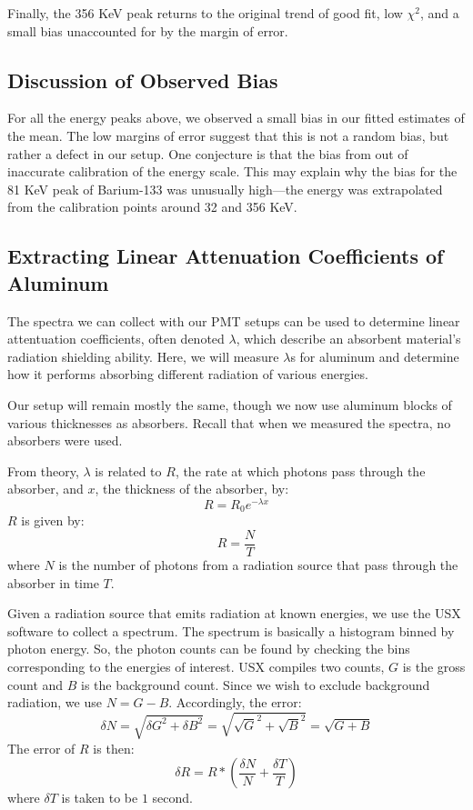 \documentclass[12pt, letterpaper]{article}
\begin{document}
Finally, the 356 KeV peak returns to the original trend of good fit, low $\chi^2$, and a small bias unaccounted for by the margin of error. 

\subsection{Discussion of Observed Bias}

For all the energy peaks above, we observed a small bias in our fitted estimates of the mean. The low margins of error suggest that this is not a random bias, but rather a defect in our setup. One conjecture is that the bias from out of inaccurate calibration of the energy scale. This may explain why the bias for the 81 KeV peak of Barium-133 was unusually high—the energy was extrapolated from the calibration points around 32 and 356 KeV. 

\subsection{Extracting Linear Attenuation Coefficients of Aluminum}

The spectra we can collect with our PMT setups can be used to determine linear attentuation coefficients, often denoted $\lambda$, which describe an absorbent material's radiation shielding ability. Here, we will measure $\lambda$s for aluminum and determine how it performs absorbing different radiation of various energies. 

Our setup will remain mostly the same, though we now use aluminum blocks of various thicknesses as absorbers. Recall that when we measured the spectra, no absorbers were used. 

From theory, $\lambda$ is related to $R$, the rate at which photons pass through the absorber, and $x$, the thickness of the absorber, by: 
\[R = R_0 e^{-\lambda x}\]
$R$ is given by:
\[R = \frac{N}{T}\]
where $N$ is the number of photons from a radiation source that pass through the absorber in time $T$. 

Given a radiation source that emits radiation at known energies, we use the USX software to collect a spectrum. The spectrum is basically a histogram binned by photon energy. So, the photon counts can be found by checking the bins corresponding to the energies of interest. USX compiles two counts, $G$ is the gross count and $B$ is the background count. Since we wish to exclude background radiation, we use $N = G - B$. Accordingly, the error:
\[\delta N = \sqrt{\delta G^2 + \delta B^2} = \sqrt{\sqrt{G}^2 + \sqrt{B}^2} = \sqrt{G + B}\]
The error of $R$ is then:
\[\delta R = R * (\frac{\delta N}{N} + \frac{\delta T}{T})\]
where $\delta T$ is taken to be $1$ second. 
\end{document}
